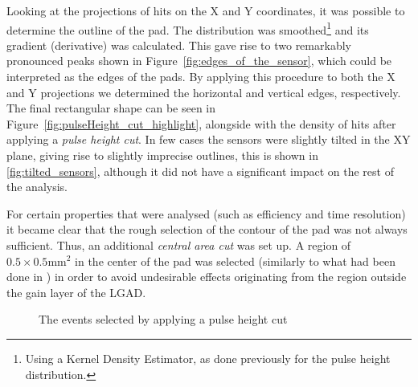Looking at the projections of hits on the X and Y coordinates, it was possible to determine the outline of the pad. The distribution was smoothed\footnote{Using a Kernel Density Estimator, as done previously for the pulse height distribution.} and its gradient (derivative) was calculated. This gave rise to two remarkably pronounced peaks shown in Figure~\ref{fig:edges_of_the_sensor}, which could be interpreted as the edges of the pads. By applying this procedure to both the X and Y projections we determined the horizontal and vertical edges, respectively. The final rectangular shape can be seen in Figure~\ref{fig:pulseHeight_cut_highlight}, alongside with the density of hits after applying a \textit{pulse height cut}. In few cases the sensors were slightly tilted in the XY plane, giving rise to slightly imprecise outlines, this is shown in \ref{fig:tilted_sensors}, although it did not have a significant impact on the rest of the analysis.


For certain properties that were analysed (such as efficiency and time resolution) it became clear that the rough selection of the contour of the pad was not always sufficient. Thus, an additional \textit{central area cut} was set up. A region of \(0.5\times0.5\unit{\milli\meter^2}\) in the center of the pad was selected (similarly to what had been done in \cite{Agapopoulou_2022}) in order to avoid undesirable effects originating from the region outside the gain layer of the LGAD.

\begin{figure}[h!tbp]
    \centering
    \hfill
    \captionsetup{width=\captionwidth}
    \caption{The events selected by applying a pulse height cut}
\end{figure}

